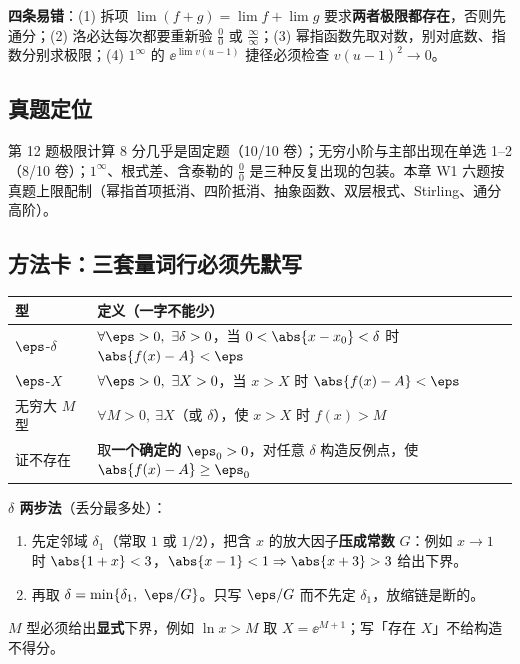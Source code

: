 \noindent\textbf{四条易错}：(1) 拆项 $\lim(f+g)=\lim f+\lim g$ 要求\textbf{两者极限都存在}，否则先通分；(2) 洛必达每次都要重新验 $\tfrac00$ 或 $\tfrac{\infty}{\infty}$；(3) 幂指函数先取对数，别对底数、指数分别求极限；(4) $1^\infty$ 的 $\ee^{\lim v(u-1)}$ 捷径必须检查 $v(u-1)^2\to0$。

\subsection{真题定位}
第 12 题极限计算 8 分几乎是固定题（10/10 卷）；无穷小阶与主部出现在单选 1--2（8/10 卷）；$1^\infty$、根式差、含泰勒的 $\tfrac00$ 是三种反复出现的包装。本章 W1 六题按真题上限配制（幂指首项抵消、四阶抵消、抽象函数、双层根式、Stirling、通分高阶）。

\subsection{方法卡：三套量词行必须先默写}

\begin{center}
\begin{tabular}{@{}p{2.7cm}p{12.5cm}@{}}
\toprule
\textbf{型} & \textbf{定义（一字不能少）} \\
\midrule
$\eps$-$\delta$ & $\forall\eps>0,\ \exists\delta>0$，当 $0<\abs{x-x_0}<\delta$ 时 $\abs{f(x)-A}<\eps$ \\
$\eps$-$X$ & $\forall\eps>0,\ \exists X>0$，当 $x>X$ 时 $\abs{f(x)-A}<\eps$ \\
无穷大 $M$ 型 & $\forall M>0,\ \exists X$（或 $\delta$），使 $x>X$ 时 $f(x)>M$ \\
证不存在 & 取\textbf{一个确定的} $\eps_0>0$，对任意 $\delta$ 构造反例点，使 $\abs{f(x)-A}\ge\eps_0$ \\
\bottomrule
\end{tabular}
\end{center}

\textbf{$\delta$ 两步法}（丢分最多处）：
\begin{enumerate}
\item 先定邻域 $\delta_1$（常取 $1$ 或 $1/2$），把含 $x$ 的放大因子\textbf{压成常数} $G$：例如 $x\to1$ 时 $\abs{1+x}<3$，$\abs{x-1}<1\Rightarrow \abs{x+3}>3$ 给出下界。
\item 再取 $\delta=\min\{\delta_1,\ \eps/G\}$。只写 $\eps/G$ 而不先定 $\delta_1$，放缩链是断的。
\end{enumerate}
$M$ 型必须给出\textbf{显式}下界，例如 $\ln x>M$ 取 $X=\ee^{M+1}$；写「存在 $X$」不给构造不得分。

